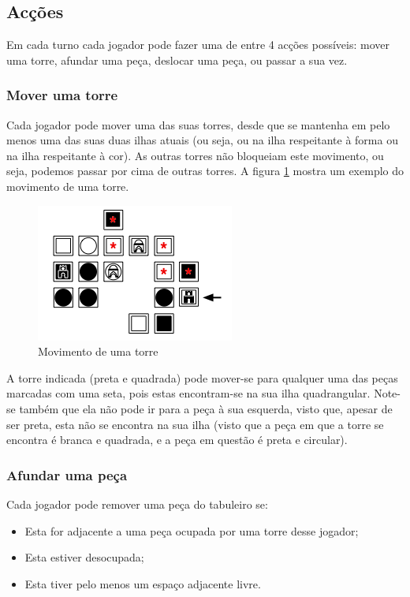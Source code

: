 \documentclass[a4paper]{article}
\begin{document}
\subsection{Acções}
\label{sec:actions}

Em cada turno cada jogador pode fazer uma de entre 4 acções possíveis: mover uma torre, afundar uma peça, deslocar uma peça, ou passar a sua vez.

\subsubsection{Mover uma torre}

Cada jogador pode mover uma das suas torres, desde que se mantenha em pelo menos uma das suas duas ilhas atuais (ou seja, ou na ilha respeitante à forma ou na ilha respeitante à cor). As outras torres não bloqueiam este movimento, ou seja, podemos passar por cima de outras torres.  A figura \ref{fig:towermovement} mostra um exemplo do movimento de uma torre.

\begin{figure}[h]
\centering
\includegraphics[scale=0.9]{towermovement.png}
\caption{Movimento de uma torre}
\label{fig:towermovement}
\end{figure}

A torre indicada (preta e quadrada) pode mover-se para qualquer uma das peças marcadas com uma seta, pois estas encontram-se na sua ilha quadrangular. Note-se também que ela não pode ir para a peça à sua esquerda, visto que, apesar de ser preta, esta não se encontra na sua ilha (visto que a peça em que a torre se encontra é branca e quadrada, e a peça em questão é preta e circular).

\subsubsection{Afundar uma peça}

Cada jogador pode remover uma peça do tabuleiro se:

\begin{itemize}
\item Esta for adjacente a uma peça ocupada por uma torre desse jogador;
\item Esta estiver desocupada;
\item Esta tiver pelo menos um espaço adjacente livre.
\end{itemize}
\end{document}
